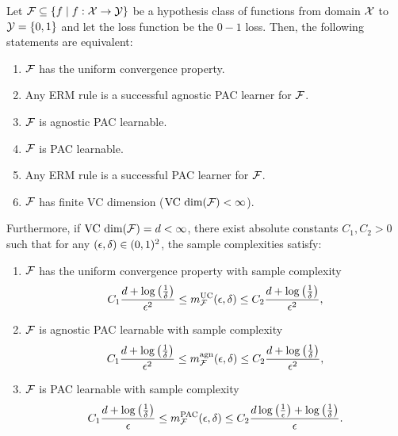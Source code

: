 \begin{thm}\label{thm:Fundamental theorem of statistical learning}
Let  $\mathcal{F} \subseteq \{f \mid f:\mathcal{X} \rightarrow \mathcal{Y}\}$ be a hypothesis class of functions from domain $\mathcal{X}$ to $\mathcal{Y} = \{0,1\}$ and let the loss function be the $0-1$ loss. Then, the following statements are equivalent:

\begin{enumerate}[label=\alph*)]
    \item $\mathcal{F}$ has the uniform convergence property.
    \item Any ERM rule is a successful agnostic PAC learner for $\mathcal{F}$.
    \item $\mathcal{F}$ is agnostic PAC learnable.
    \item $\mathcal{F}$ is PAC learnable.
    \item Any ERM rule is a successful PAC learner for $\mathcal{F}$.
    \item $\mathcal{F}$ has finite VC dimension ($\text{VC dim}(\mathcal{F}) < \infty$).
\end{enumerate}
Furthermore, if $\text{VC dim}(\mathcal{F}) = d < \infty$, there exist absolute constants $C_1, C_2 > 0$ such that for any $(\epsilon,\delta) \in (0,1)^2$, the sample complexities satisfy:
\begin{enumerate}[1.]
    \item $\mathcal{F}$ has the uniform convergence property with sample complexity
    \begin{equation}\label{eqn:sample complexity:UC}
    C_1\frac{d + \log\left(\frac{1}{\delta}\right)}{\epsilon^2} \leq m_{\mathcal{F}}^{\mathrm{UC}}(\epsilon,\delta) \leq C_2\frac{d + \log\left(\frac{1}{\delta}\right)}{\epsilon^2},
    \end{equation}
    \item $\mathcal{F}$ is agnostic PAC learnable with sample complexity
    \begin{equation}\label{eqn:sample complexity:thm:Fundamental theorem of statistical learning}
    C_1\frac{d + \log\left(\frac{1}{\delta}\right)}{\epsilon^2} \leq m_{\mathcal{F}}^{\mathrm{agn}}(\epsilon,\delta) \leq C_2\frac{d + \log\left(\frac{1}{\delta}\right)}{\epsilon^2},
    \end{equation}
    \item $\mathcal{F}$ is PAC learnable with sample complexity
    \begin{equation}\label{eqn:sample complexity:PAC}
    C_1\frac{d + \log\left(\frac{1}{\delta}\right)}{\epsilon} \leq m_{\mathcal{F}}^{\mathrm{PAC}}(\epsilon,\delta) \leq C_2\frac{d \log\left(\frac{1}{\epsilon}\right) + \log\left(\frac{1}{\delta}\right)}{\epsilon}.
    \end{equation}
\end{enumerate}
\end{thm}

